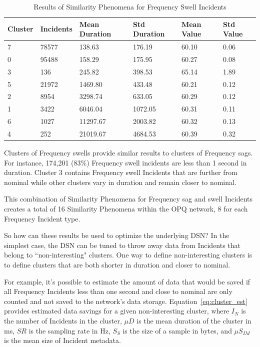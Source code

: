 \begin{table}[H]
    \centering
    \caption{Results of Similarity Phenomena for Frequency Swell Incidents}
    \begin{tabularx}{\textwidth}{llllll}
        \toprule
        \textbf{Cluster} & \textbf{Incidents} &\textbf{Mean Duration} & \textbf{Std Duration} & \textbf{Mean Value} & \textbf{Std Value} \\
        \midrule
        7 & 78577 & 138.63 & 176.19 & 60.10 & 0.06 \\
        0 & 95488 & 158.29 & 175.95 & 60.27 & 0.08 \\
        3 & 136 & 245.82 & 398.53 & 65.14 & 1.89 \\
        5 & 21972 & 1469.80 & 433.48 & 60.21 & 0.12 \\
        2 & 8954 & 3298.74 & 633.05 & 60.29 & 0.12 \\
        1 & 3422 & 6046.04 & 1072.05 & 60.31 & 0.11 \\
        6 & 1027 & 11297.67 & 2003.82 & 60.32 & 0.13 \\
        4 & 252 & 21019.67 & 4684.53 & 60.39 & 0.32 \\
        \bottomrule
    \end{tabularx}
    \label{table:f_kmeans_swells}
\end{table}

Clusters of Frequency swells provide similar results to clusters of Frequency sags. For instance, 174,201 (83\%) Frequency swell incidents are less than 1 second in duration. Cluster 3 contains Frequency swell Incidents that are further from nominal while other clusters vary in duration and remain closer to nominal.

This combination of Similarity Phenomena for Frequency sag and swell Incidents creates a total of 16 Similarity Phenomena within the OPQ network, 8 for each Frequency Incident type.

So how can these results be used to optimize the underlying DSN? In the simplest case, the DSN can be tuned to throw away data from Incidents that belong to ``non-interesting" clusters. One way to define non-interesting clusters is to define clusters that are both shorter in duration and closer to nominal.

For example, it's possible to estimate the amount of data that would be saved if all Frequency Incidents less than one second and close to nominal are only counted and not saved to the network's data storage. Equation~\ref{eq:cluster_est} provides estimated data savings for a given non-interesting cluster, where $I_N$ is the number of Incidents in the cluster, $\mu D$ is the mean duration of the cluster in ms, $SR$ is the sampling rate in Hz, $S_S$ is the size of a sample in bytes, and $\mu S_{IM}$ is the mean size of Incident metadata.

